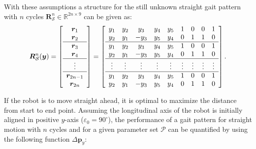 \documentclass[10pt,a4paper]{article}
\begin{document}

With these assumptions a structure for the still unknown straight gait pattern with $n$ cycles $\bm{R}_\mathcal{S}^n \in \mathbb{R}^{2n \times 9} $ can be given as:
\begin{equation}
\bm{R}_\mathcal{S}^n(\bm{y})
=
\left[
\begin{array}{c}
\bm{r}_1 \\
\bm{r}_2 \\
\hline
\bm{r}_3 \\
\bm{r}_4 \\
\hline
\vdots \\
\hline
\bm{r}_{2n-1} \\
\bm{r}_{2n} \\
\end{array}
\right]
=
\left[
\begin{array}{ccccc cccc}
y_1&y_2& y_3&y_4&y_5&1&0&0&1 \\
y_2&y_1&-y_3&y_5&y_4&0&1&1&0 \\ 
\hline
y_1&y_2& y_3&y_4&y_5&1&0&0&1 \\
y_2&y_1&-y_3&y_5&y_4&0&1&1&0 \\
\hline
\vdots&\vdots&\vdots&\vdots&\vdots&\vdots&\vdots&\vdots&\vdots \\
\hline
y_1&y_2& y_3&y_4&y_5&1&0&0&1 \\
y_2&y_1&-y_3&y_5&y_4&0&1&1&0 \\
\end{array}
\right] .
\label{eq:gait_ptrn}
\end{equation}




If the robot is to move straight ahead, it is optimal to maximize the distance from start to end point.
Assuming the longitudinal axis of the robot is initially aligned in positive $y$-axis ($\varepsilon_0 = 90^\circ$), the performance of a gait pattern for straight motion with $n$ cycles and for a given parameter set $\mathcal{P}$ can be quantified by using the following function $\Delta \bm{p}_y$:
\end{document}
